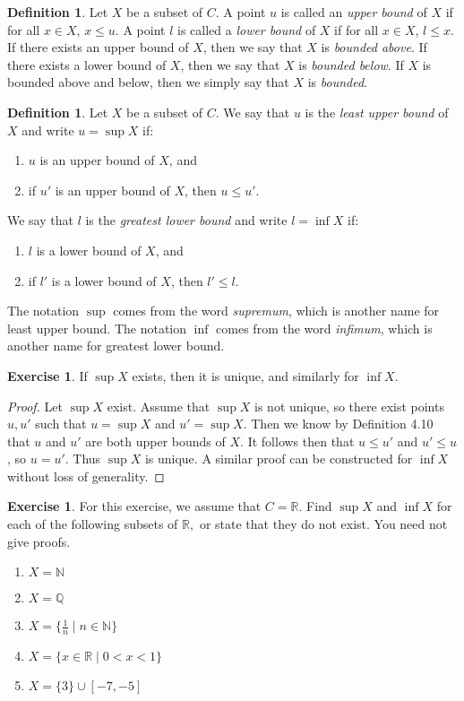 \documentclass[12pt]{article}
\newcommand{\bbN}{\mathbb{N}}
\newcommand{\bbQ}{\mathbb{Q}}
\newcommand{\bbR}{\mathbb{R}}
\renewcommand{\_}[1]{\underline{ #1 }}
\theoremstyle{definition}
\newtheorem{definition}[theorem]{Definition}
\newtheorem{exercise}[theorem]{Exercise}
\numberwithin{equation}{subsection}
\begin{document}
\begin{definition}  Let $X$ be a subset of $C$.  A point $u$ is called an \emph{upper bound} of $X$ if for all $x \in X$, $x \leq u$.  A point $l$ is called a \emph{lower bound} of $X$ if for all $x \in X$, $l \leq x$.  If there exists an upper bound of $X$, then we say that $X$ is \emph{bounded above}.  If there exists a lower bound of $X$, then we say that $X$ is \emph{bounded below}.  If $X$ is bounded above and below, then we simply say that $X$ is \emph{bounded}.
\end{definition}


\begin{definition}  Let $X$ be a subset of $C$.  We say that $u$ is the \emph{least upper bound} of $X$ and write $u = \sup X$ if:
\begin{enumerate}
\item  $u$ is an upper bound of $X$, and
\item  if $u'$ is an upper bound of $X$, then $u \leq u'$.
\end{enumerate}
We say that $l$ is the \emph{greatest lower bound} and write $l = \inf X$ if:
\begin{enumerate}
\item $l$ is a lower bound of $X$, and
\item if $l'$ is a lower bound of $X$, then $l' \leq l$.
\end{enumerate}
\end{definition}

\noindent The notation $\sup$ comes from the word \emph{supremum}, which is another name for least upper bound.  The notation $\inf$ comes from the word \emph{infimum}, which is another name for greatest lower bound.

\begin{exercise}  If $\sup X$ exists, then it is unique, and similarly for $\inf X$.
\end{exercise}

\begin{proof}
Let $\sup X$ exist. Assume that $\sup X$ is not unique, so there exist points $u, u'$ such that $u =\sup X$ and $u' = \sup X$. Then we know by Definition 4.10 that $u$ and $u'$ are both upper bounds of $X$. It follows then that $u \leq u'$ and $u' \leq u$, so $u =u'$. Thus $\sup X$ is unique. A similar proof can be constructed for $\inf X$ without loss of generality.
\end{proof}

\begin{exercise} For this exercise, we assume that $C=\bbR.$ Find $\sup X$ and $\inf X$ for each of the following subsets
of $\bbR,$ or state that they do not exist. You need not give proofs.
\begin{enumerate}
\item $X=\bbN$
\item $X=\bbQ$
\item $X=\{\frac1n\mid n\in\bbN\}$
\item $X=\{x\in\bbR\mid 0<x<1\}$
\item $X=\{3\}\cup [-7,-5]$
\end{enumerate}
\end{exercise}
\end{document}
